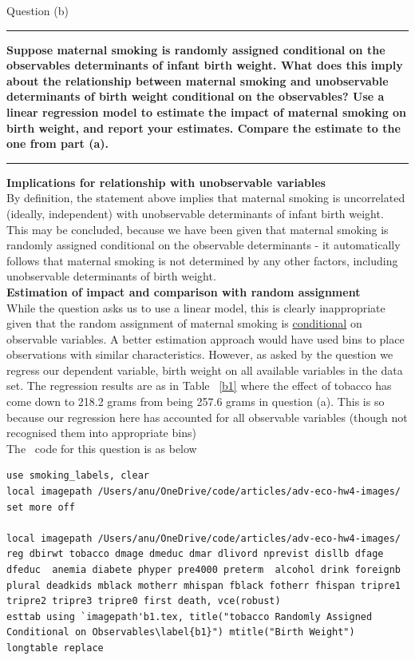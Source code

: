 \documentclass[12pt]{article}
\newcommand\question[1]{\vspace{1em}\hrule\vspace{1em}\textbf{#1}\vspace{1em}\hrule\vspace{1em}}
\begin{document}
\newpage
\begin{center}\LARGE{Question (b)}\end{center}
\question{Suppose maternal smoking is randomly assigned conditional on the observables determinants of infant birth weight.  What does this imply about the relationship between maternal smoking and unobservable determinants of birth weight conditional on the observables?  Use a linear regression model to estimate the impact of maternal smoking on birth weight, and report your estimates.  Compare the estimate to the one from part (a).
}


\textbf{Implications for relationship with unobservable variables}\\
By definition, the statement above implies that maternal smoking is uncorrelated (ideally, independent) with unobservable determinants of infant birth weight. This may be concluded, because we have been given that maternal smoking is randomly assigned conditional on the observable determinants - it automatically follows that maternal smoking is not determined by any other factors, including unobservable determinants of birth weight.\\



\textbf{Estimation of impact and comparison with random assignment}\\
While the question asks us to use a linear model, this is clearly inappropriate given that the random assignment of maternal smoking is \uline{conditional} on observable variables. A better estimation approach would have used bins to place observations with similar characteristics. However, as asked by the question we regress our dependent variable, birth weight on all available variables in the data set. The regression results are as in Table ~\ref{b1} where the effect of tobacco has come down to 218.2 grams from being 257.6 grams in question (a). This is so because our regression here has accounted for all observable variables (though not recognised them into appropriate bins)\\

The \stata \ code   for this question is as below
\begin{lstlisting}
use smoking_labels, clear
local imagepath /Users/anu/OneDrive/code/articles/adv-eco-hw4-images/
set more off

local imagepath /Users/anu/OneDrive/code/articles/adv-eco-hw4-images/
reg dbirwt tobacco dmage dmeduc dmar dlivord nprevist disllb dfage dfeduc  anemia diabete phyper pre4000 preterm  alcohol drink foreignb plural deadkids mblack motherr mhispan fblack fotherr fhispan tripre1 tripre2 tripre3 tripre0 first death, vce(robust)
esttab using `imagepath'b1.tex, title("tobacco Randomly Assigned Conditional on Observables\label{b1}") mtitle("Birth Weight") longtable replace
\end{lstlisting}
\end{document}
